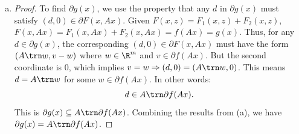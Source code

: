 \documentclass{article}
\theoremstyle{plain}
\theoremstyle{definition}
\theoremstyle{remark}
\begin{document}
\begin{solution}
\begin{enumerate}[(a)]
{\begin{proof}
\begin{itemize}
                \end{itemize}
            \end{proof}
        }
        \item {
            \begin{proof}
                To find $\partial g(x)$, we use the property that any $d$ in $\partial g(x)$ must satisfy $(d,0)\in\partial F(x,Ax)$. Given $F(x,z)=F_1(x,z)+F_2(x,z)$, $F(x,Ax)=F_1(x,Ax)+F_2(x,Ax)=f(Ax)=g(x)$. Thus, for any $d\in\partial g(x)$, the corresponding $(d,0)\in\partial F(x,Ax)$ must have the form $(A\trn w, v-w)$ where $w\in\R^m$ and $v\in\partial f(Ax)$. But the second coordinate is $0$, which implies $v=w\Rightarrow (d,0)=(A\trn w,0)$. This means $d=A\trn w$ for some $w\in\partial f(Ax)$. In other words: \[d\in A\trn\partial f(Ax).\] This is $\partial g(x)\subseteq A\trn\partial f(Ax)$. Combining the results from (a), we have $\partial g(x)=A\trn\partial f(Ax)$.
            \end{proof}
        }
    \end{enumerate}
\end{solution}
\end{document}
